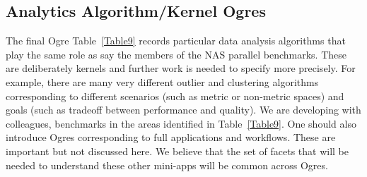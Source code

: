 \documentclass{acm_proc_article-sp}
\begin{document}
\subsection{Analytics Algorithm/Kernel Ogres}

The final Ogre Table~\ref{Table9} records particular data analysis algorithms
that play the same role as say the members of the NAS parallel benchmarks.
These are deliberately kernels and further work is needed to specify more
precisely. For example, there are many very different outlier and clustering
algorithms corresponding to different scenarios (such as metric or non-metric
spaces) and goals (such as tradeoff between performance and quality). We are
developing with colleagues, benchmarks in the areas identified in
Table~\ref{Table9}. One should also introduce Ogres corresponding to full
applications and workflows. These are important but not discussed here. We
believe that the set of facets that will be needed to understand these other
mini-apps will be common across Ogres.
\end{document}
